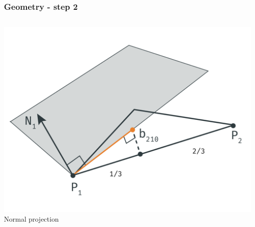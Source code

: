 	\begin{frame}\frametitle{Geometry - step 2}
		\begin{columns}
			\begin{column}{0.6\textwidth}
				\begin{center}
				\includegraphics[width=\textwidth]{img/1_single/geometry_2.png}
				\small{Normal projection}
				\end{center}
			\end{column}
		\end{columns}
	\end{frame}

